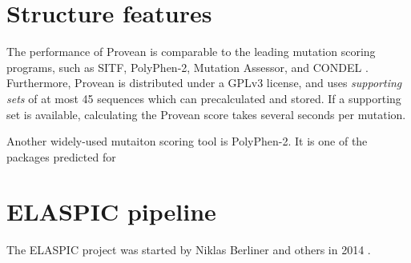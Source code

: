 %
%
%
%
%





\section{Structure features}

The performance of Provean is comparable to the leading mutation scoring programs, such as SITF, PolyPhen-2, Mutation Assessor, and CONDEL \cite{choi_predicting_2012}. Furthermore, Provean is distributed under a GPLv3 license, and uses \textit{supporting sets} of at most 45 sequences which can precalculated and stored. If a supporting set is available, calculating the Provean score takes several seconds per mutation.

Another widely-used mutaiton scoring tool is PolyPhen-2. It is one of the packages predicted for




\section{ELASPIC pipeline}

The ELASPIC project was started by Niklas Berliner and others in 2014 \cite{berliner_combining_2014}.

